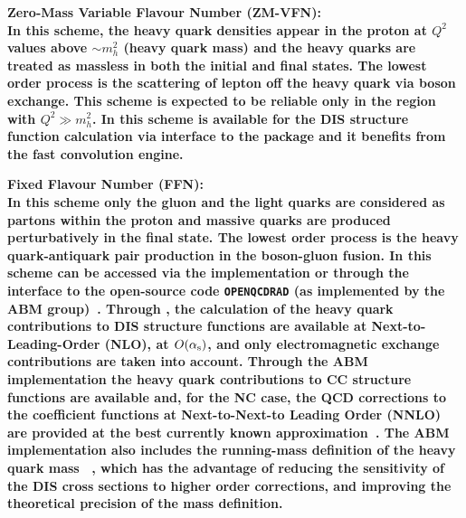 \begin{description}
\item \bf{Zero-Mass Variable Flavour Number (ZM-VFN)}\rm \cite{ZMVFNpub}:
\\
In this scheme, the
heavy quark densities appear in the proton at $Q^2$ values above $\sim m_h^2$ (heavy quark mass)
and the heavy quarks
are treated as massless in both the initial 
and final states. The lowest order process is the
scattering of lepton off the heavy quark via boson exchange.
This scheme is expected to be reliable only in the region with $Q^2 \gg m_h^2$.
In \fitter this scheme is available for the DIS structure function calculation 
via interface to the \qcdnum \cite{qcdnum} package and it benefits 
from the fast \qcdnum convolution engine.

\item \bf {Fixed Flavour Number (FFN)}\rm \cite{Laenen:1992, Laenen:1993, Riem:1995}: 
\\
In this scheme only the gluon and the light quarks are considered
as partons within the proton and massive 
quarks are produced perturbatively in the final state.
The lowest order process is
the heavy quark-antiquark pair production in the boson-gluon fusion.
In \fitter this scheme can be accessed via the 
\qcdnum implementation or through the interface to the open-source code \texttt{OPENQCDRAD} (as implemented by the ABM group)~\cite{openqcdrad:page}.
Through \qcdnum, the calculation of the heavy quark contributions to DIS structure functions
are available at Next-to-Leading-Order (NLO), at $O(\alpha_\mathrm{s})$, and only electromagnetic exchange contributions are taken into account.
Through the ABM implementation the heavy quark contributions to CC structure functions are available 
and, for the NC case, the QCD corrections to the coefficient functions at Next-to-Next-to Leading Order (NNLO)
are provided at the best currently known approximation~\cite{SMoch:npb864}.
The ABM implementation also includes the running-mass definition of the heavy quark 
mass ~\cite{Alekhin:runm}, which 
has the advantage of reducing the sensitivity of the DIS cross sections to
higher order corrections, and improving the theoretical precision of the mass definition. 



\end{description}
